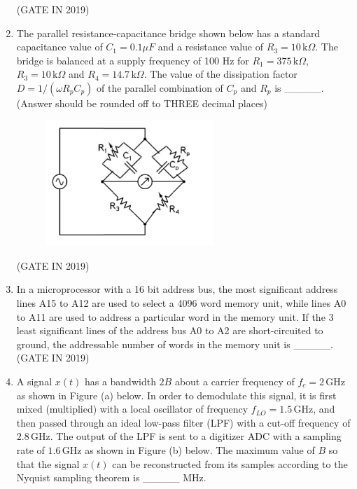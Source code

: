 \documentclass[journal]{IEEEtran}
\begin{document}
\begin{enumerate}
\begin{figure}[H]
    \caption{}
    \label{fig:fig20}
\end{figure}
\hfill(GATE IN 2019)
\item The parallel resistance-capacitance bridge shown below has a standard capacitance value of $C_1=0.1 \mu F$ and a resistance value of $R_3=10 \, \text{k}\Omega$. The bridge is balanced at a supply frequency of 100 Hz for $R_1=375 \, \text{k}\Omega$, $R_3=10 \, \text{k}\Omega$ and $R_4=14.7 \, \text{k}\Omega$. The value of the dissipation factor $D = 1/(\omega R_p C_p)$ of the parallel combination of $C_p$ and $R_p$ is \_\_\_\_\_. (Answer should be rounded off to THREE decimal places)
\begin{figure}[H]
    \centering
    \includegraphics[width=0.6\textwidth]{21.png}
    \caption{}
    \label{fig:fig21}
\end{figure}
\hfill(GATE IN 2019)
\item In a microprocessor with a 16 bit address bus, the most significant address lines A15 to A12 are used to select a 4096 word memory unit, while lines A0 to A11 are used to address a particular word in the memory unit. If the 3 least significant lines of the address bus A0 to A2 are short-circuited to ground, the addressable number of words in the memory unit is \_\_\_\_\_.
\hfill(GATE IN 2019)
\item A signal $x(t)$ has a bandwidth $2B$ about a carrier frequency of $f_c = 2 \, \text{GHz}$ as shown in Figure (a) below. In order to demodulate this signal, it is first mixed (multiplied) with a local oscillator of frequency $f_{LO} = 1.5 \, \text{GHz}$, and then passed through an ideal low-pass filter (LPF) with a cut-off frequency of $2.8 \, \text{GHz}$. The output of the LPF is sent to a digitizer ADC with a sampling rate of $1.6 \, \text{GHz}$ as shown in Figure (b) below. The maximum value of $B$ so that the signal $x(t)$ can be reconstructed from its samples according to the Nyquist sampling theorem is \_\_\_\_\_ MHz.
\begin{figure}[H]

\end{figure}
\end{enumerate}
\end{document}
